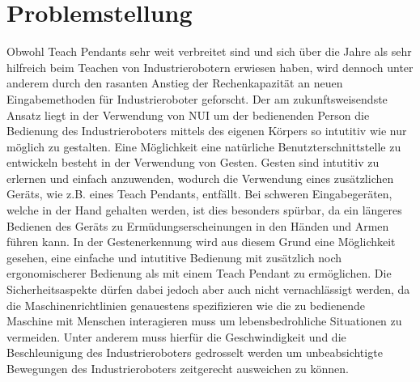 \section{Problemstellung}
Obwohl Teach Pendants sehr weit verbreitet sind und sich über die Jahre als sehr hilfreich beim Teachen von Industrierobotern erwiesen haben, wird dennoch unter anderem durch den rasanten Anstieg der Rechenkapazität an neuen Eingabemethoden für Industrieroboter geforscht. Der am zukunftsweisendste Ansatz liegt in der Verwendung von NUI um der bedienenden Person die Bedienung des Industrieroboters mittels des eigenen Körpers so intutitiv wie nur möglich zu gestalten. Eine Möglichkeit eine natürliche Benutzterschnittstelle zu entwickeln besteht in der Verwendung von Gesten. Gesten sind intutitiv zu erlernen und einfach anzuwenden, wodurch die Verwendung eines zusätzlichen Geräts, wie z.B. eines Teach Pendants, entfällt. Bei schweren Eingabegeräten, welche in der Hand gehalten werden, ist dies besonders spürbar, da ein längeres Bedienen des Geräts zu Ermüdungserscheinungen in den Händen und Armen führen kann. In der Gestenerkennung wird aus diesem Grund eine Möglichkeit gesehen, eine einfache und intutitive Bedienung mit zusätzlich noch ergonomischerer Bedienung als mit einem Teach Pendant zu ermöglichen. Die Sicherheitsaspekte dürfen dabei jedoch aber auch nicht vernachlässigt werden, da die Maschinenrichtlinien genauestens spezifizieren wie die zu bedienende Maschine mit Menschen interagieren muss um lebensbedrohliche Situationen zu vermeiden. Unter anderem muss hierfür die Geschwindigkeit und die Beschleunigung des Industrieroboters gedrosselt werden um unbeabsichtigte Bewegungen des Industrieroboters zeitgerecht ausweichen zu können.

